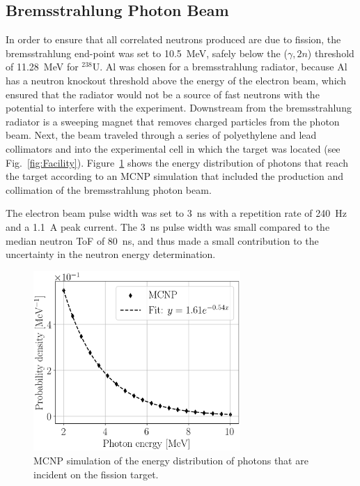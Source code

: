 \subsection{Bremsstrahlung Photon Beam}
\label{beam}
In order to ensure that all correlated neutrons produced are due to fission, the bremsstrahlung end-point was set to 10.5~MeV, safely below the ($\gamma, 2n$) threshold of 11.28~MeV for $^{238}$U.
Al was chosen for a bremsstrahlung radiator, because Al has a neutron knockout threshold above the energy of the electron beam, which ensured that the radiator would not be a source of fast neutrons with the potential to interfere with the experiment.
Downstream from the bremsstrahlung radiator is a sweeping magnet that removes charged particles from the photon beam.
Next, the beam traveled through a series of polyethylene and lead collimators and into the experimental cell in which the target was located (see Fig.~\ref{fig:Facility}).
Figure~\ref{fig:BremDist} shows the energy distribution of photons that reach the target according to an MCNP simulation that included the production and collimation of the bremsstrahlung photon beam.

The electron beam pulse width was set to 3~ns with a repetition rate of 240~Hz and a 1.1~A peak current.
The 3~ns pulse width was small compared to the median neutron ToF of 80~ns, and thus made a small contribution to the uncertainty in the neutron energy determination.

\begin{figure}[h]
\centering
\includegraphics[width=0.7\textwidth]{Content/Methods/MCNPBremDistribution.png}
\caption{MCNP simulation of the energy distribution of photons that are incident on the fission target.}
\label{fig:BremDist}
\end{figure}

